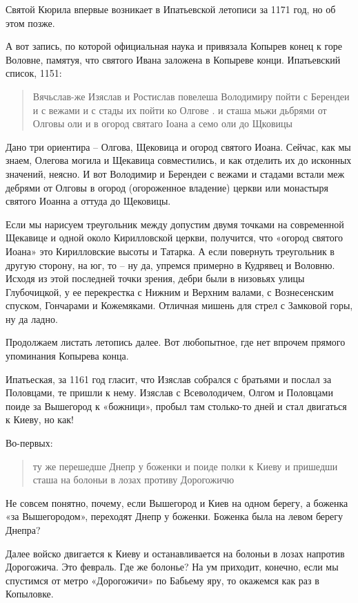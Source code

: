 Святой Кюрила впервые возникает в Ипатьевской летописи за 1171 год, но об этом позже.

А вот запись, по которой официальная наука и привязала Копырев конец к горе Воловне, памятуя, что святого Ивана заложена в Копыреве конци. Ипатьевский список, 1151:

\begin{quotation}
Вячьслав-же Изяслав и Ростислав повелеша Володимиру пойти с Берендеи и с вежами и с стады их пойти ко Олгове . и сташа мьжи дьбрями от Олговы оли и в огород святаго Іоана а семо оли до Щковицы
\end{quotation}

Дано три ориентира – Олгова, Щековица и огород святого Иоана. Сейчас, как мы знаем, Олегова могила и Щекавица совместились, и как отделить их до исконных значений, неясно. И вот Володимир и Берендеи с вежами и стадами встали меж дебрями от Олговы в огород (огороженное владение) церкви или монастыря святого Иоанна а оттуда до Щековицы.

Если мы нарисуем треугольник между допустим двумя точками на современной Щекавице и одной около Кирилловской церкви, получится, что «огород святого Иоана» это Кирилловские высоты и Татарка. А если повернуть треугольник в другую сторону, на юг, то – ну да, упремся примерно в Кудрявец и Воловню. Исходя из этой последней точки зрения, дебри были в низовьях улицы Глубочицкой, у ее перекрестка с Нижним и Верхним валами, с Вознесенским спуском, Гончарами и Кожемяками. Отличная мишень для стрел с Замковой горы, ну да ладно.

Продолжаем листать летопись далее. Вот любопытное, где нет впрочем прямого упоминания Копырева конца. 

Ипатьеская, за 1161 год гласит, что Изяслав собрался с братьями и послал за Половцами, те пришли к нему. Изяслав с Всеволодичем, Олгом и Половцами поиде за Вышегород к «божници», пробыл там столько-то дней и стал двигаться к Киеву, но как!

Во-первых:

\begin{quotation}
ту же перешедше Днепр у боженки и поиде полки к Киеву и пришедши сташа на болоньи  в лозах противу Дорогожичю
\end{quotation}
  
Не совсем понятно, почему, если Вышегород и Киев на одном берегу, а боженка «за Вышегородом», переходят Днепр у боженки. Боженка была на левом берегу Днепра? 

Далее войско двигается к Киеву и останавливается на болоньи в лозах напротив Дорогожича. Это февраль. Где же болонье? На ум приходит, конечно, если мы спустимся от метро «Дорогожичи» по Бабьему яру, то окажемся как раз в Копыловке. 

